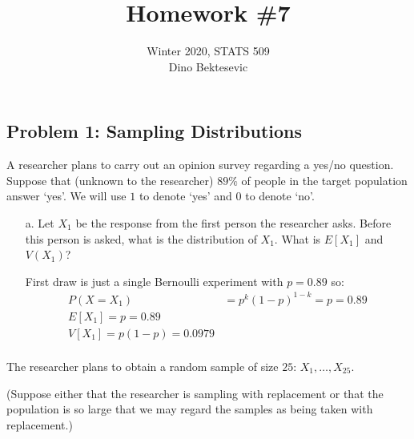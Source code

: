 \documentclass{article}
\date{{}}
\newcommand{\1}{\mathbf{1}}
\begin{document}
\title{Homework \#7}
\author{\normalsize{Winter 2020, STATS 509}\\
\normalsize{Dino Bektesevic}}
\maketitle

\subsection*{Problem 1: Sampling Distributions}

A researcher plans to carry out an opinion survey regarding a yes/no question. Suppose that (unknown to the researcher) $89\%$ of people in the target population answer `yes'. We will use $1$ to denote `yes' and $0$ to denote `no'.

\begin{itemize}
    \item[a.] Let $X_1$ be the response from the first person the researcher asks. Before this person is asked, what is the distribution of $X_1$. What is $E[X_1]$ and $V(X_1)$?
    
    First draw is just a single Bernoulli experiment with $p=0.89$ so:
    \begin{align*}
        P(X=X_1) &= p^k(1-p)^{1-k} = p = 0.89 \\
        E[X_1] = p = 0.89 \\
        V[X_1] = p(1-p) = 0.0979 \\
    \end{align*}
\end{itemize}

The researcher plans to obtain a random sample of size $25$: $X_1,\ldots , X_{25}$. \par
(Suppose either that the researcher is sampling with replacement or that the population is so large that we may regard the samples as being taken with replacement.)
\end{document}
